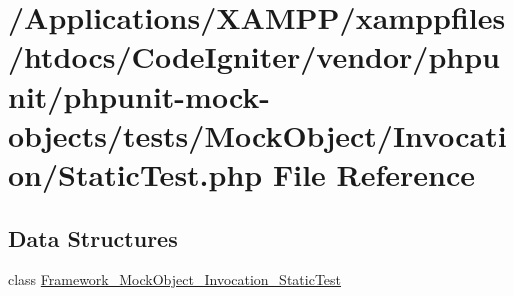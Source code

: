 \hypertarget{_static_test_8php}{}\section{/\+Applications/\+X\+A\+M\+P\+P/xamppfiles/htdocs/\+Code\+Igniter/vendor/phpunit/phpunit-\/mock-\/objects/tests/\+Mock\+Object/\+Invocation/\+Static\+Test.php File Reference}
\label{_static_test_8php}
\subsection*{Data Structures}
\begin{DoxyCompactItemize}
\item 
class \mbox{\hyperlink{class_framework___mock_object___invocation___static_test}{Framework\+\_\+\+Mock\+Object\+\_\+\+Invocation\+\_\+\+Static\+Test}}
\end{DoxyCompactItemize}
